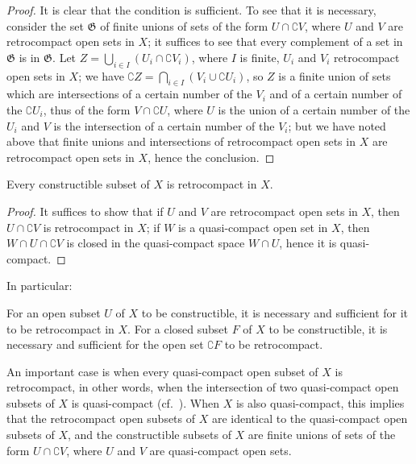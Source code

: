 \begin{proof}
It is clear that the condition is sufficient.
To see that it is necessary, consider the set $\mathfrak{G}$ of finite unions of sets of the form $U\cap\complement{V}$, where $U$ and $V$ are retrocompact open sets in $X$; it suffices to see that every complement of a set in $\mathfrak{G}$ is in $\mathfrak{G}$.
Let $Z=\bigcup_{i\in I}(U_i\cap\complement{V_i})$, where $I$ is finite, $U_i$ and $V_i$ retrocompact open sets in $X$; we have
$\complement{Z}=\bigcap_{i\in I}(V_i\cup\complement{U_i})$, so $Z$ is a finite union of sets which are intersections of a certain number of the $V_i$ and of a certain number of the $\complement{U_i}$, thus of the form
$V\cap\complement{U}$, where $U$ is the union of a certain number of the $U_i$ and $V$ is the intersection of a certain number of the $V_i$; but we have noted above that finite unions and intersections of retrocompact open sets in $X$ are retrocompact open sets in $X$, hence the conclusion.
\end{proof}

\begin{corollary}[9.1.4]
\label{0.9.1.4}
Every constructible subset of $X$ is retrocompact in $X$.
\end{corollary}

\begin{proof}
It suffices to show that if $U$ and $V$ are retrocompact open sets in $X$, then $U\cap\complement{V}$ is retrocompact in $X$; if $W$ is a quasi-compact open set in $X$, then $W\cap U\cap\complement{V}$ is closed in the quasi-compact space $W\cap U$, hence it is quasi-compact.
\end{proof}

In particular:
\begin{corollary}[9.1.5]
\label{0.9.1.5}
For an open subset $U$ of $X$ to be constructible, it is necessary and sufficient for it to be retrocompact in $X$.
For a closed subset $F$ of $X$ to be constructible, it is necessary and sufficient for the open set $\complement{F}$ to be retrocompact.
\end{corollary}

\begin{env}[9.1.6]
\label{0.9.1.6}
An important case is when every quasi-compact open subset of $X$ is retrocompact, in other words, when the intersection of two quasi-compact open subsets of $X$ is quasi-compact (cf.~).
When $X$ is also quasi-compact, this implies that the retrocompact open subsets of $X$ are identical to the quasi-compact open subsets of $X$, and the constructible subsets of $X$ are finite unions of sets of the form $U\cap\complement{V}$, where $U$ and $V$ are quasi-compact open sets.
\end{env}

